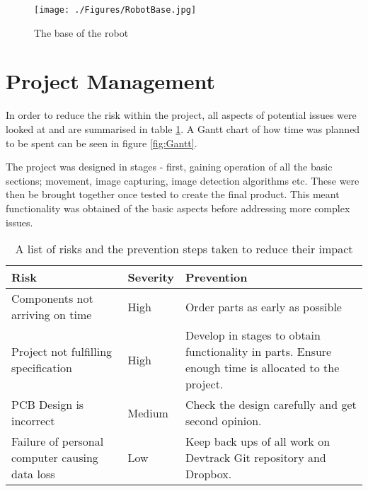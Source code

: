 \begin{figure}
\centering
\texttt{[image: ./Figures/RobotBase.jpg]}
\caption{The base of the robot}
\label{fig:RobotBase}
\end{figure}

\section{Project Management}
In order to reduce the risk within the project, all aspects of potential issues were looked at and are summarised in table \ref{tab:risk}. A Gantt chart of how time was planned to be spent can be seen in figure \ref{fig:Gantt}.  

The project was designed in stages - first, gaining operation of all the basic sections; movement, image capturing, image detection algorithms etc. These were then be brought together once tested to create the final product. This meant functionality was obtained of the basic aspects before addressing more complex issues. 
\begin{table}
\begin{tabular}{p{6cm}p{2cm}p{6cm}}\toprule
Risk						&	Severity	&	Prevention \\ \toprule
Components not arriving on time	&	High		&	Order parts as early as possible \\ \midrule
Project not fulfilling specification				&	High		&	Develop in stages to obtain functionality in parts. Ensure enough time is allocated to the project.	\\\midrule
PCB Design is incorrect		&	Medium		&	Check the design carefully and get second opinion. \\\midrule
Failure of personal computer causing data loss & Low	& 	Keep back ups of all work on Devtrack Git repository and Dropbox.\\

\bottomrule
\end{tabular}
\caption{A list of risks and the prevention steps taken to reduce their impact}
\label{tab:risk}
\end{table}
